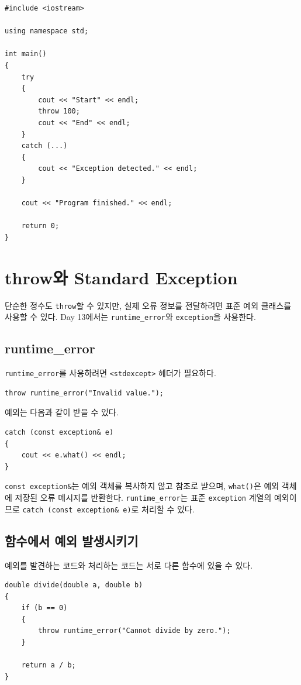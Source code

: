 \documentclass[11pt,a4paper]{article}
\begin{document}
\begin{lstlisting}
#include <iostream>

using namespace std;

int main()
{
    try
    {
        cout << "Start" << endl;
        throw 100;
        cout << "End" << endl;
    }
    catch (...)
    {
        cout << "Exception detected." << endl;
    }

    cout << "Program finished." << endl;

    return 0;
}
\end{lstlisting}

\section{throw와 Standard Exception}
단순한 정수도 \texttt{throw}할 수 있지만,
실제 오류 정보를 전달하려면 표준 예외 클래스를 사용할 수 있다.
Day 13에서는 \texttt{runtime\_error}와 \texttt{exception}을 사용한다.

\subsection{runtime\_error}
\texttt{runtime\_error}를 사용하려면 \texttt{<stdexcept>} 헤더가 필요하다.

\begin{lstlisting}
throw runtime_error("Invalid value.");
\end{lstlisting}

예외는 다음과 같이 받을 수 있다.

\begin{lstlisting}
catch (const exception& e)
{
    cout << e.what() << endl;
}
\end{lstlisting}

\texttt{const exception\&}는 예외 객체를 복사하지 않고 참조로 받으며,
\texttt{what()}은 예외 객체에 저장된 오류 메시지를 반환한다.
\texttt{runtime\_error}는 표준 \texttt{exception} 계열의 예외이므로
\texttt{catch (const exception\& e)}로 처리할 수 있다.

\subsection{함수에서 예외 발생시키기}
예외를 발견하는 코드와 처리하는 코드는 서로 다른 함수에 있을 수 있다.

\begin{lstlisting}
double divide(double a, double b)
{
    if (b == 0)
    {
        throw runtime_error("Cannot divide by zero.");
    }

    return a / b;
}
\end{lstlisting}
\end{document}
